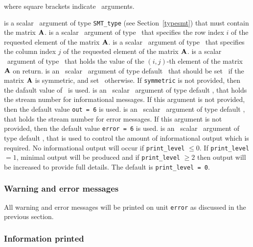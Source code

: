 \documentclass{galahad}
\begin{document}
\vspace*{1mm}
\noindent where square brackets indicate \optional\ arguments.
\vspace*{0mm}
\begin{description}
   is a scalar \intentin\ argument of type {\tt SMT\_type} (see
     Section~\ref{typesmt}) that must contain the matrix ${\mathbf{A}}$.
   is a scalar \intentin\ argument of type \integer\ that
     specifies the row index $i$ of the requested element of the
     matrix ${\mathbf{A}}$.
   is a scalar \intentin\ argument of type \integer\ that
     specifies the column index $j$ of the requested element of the
     matrix ${\mathbf{A}}$.
   is a scalar \intentout\ argument of type \realdp\ that
     holds the value of the $(i,j)$-th element of the matrix ${\mathbf{A}}$ on return.
   is an \optional\ scalar \intentin\ argument of type default
     \logical\ that should be set \true\ if the matrix ${\mathbf{A}}$ is
     symmetric, and set \false\ otherwise.  If {\tt symmetric} is not
     provided, then the dafault value of \false\ is used.
   is an \optional\ scalar \intentin\ argument of type default \integer, that holds the
     stream number for informational messages. If this argument is not
     provided, then the default value {\tt out = 6} is used.
   is an \optional\ scalar \intentin\ argument of type default \integer, that holds the
     stream number for error messages. If this argument is not
     provided, then the default value {\tt error = 6} is used.
   is an \optional\ scalar \intentin\ argument of type default \integer, that is used
     to control the amount of informational output which is required. No
     informational output will occur if {\tt print\_level} $\leq 0$. If
     {\tt print\_level} $= 1$, minimal output will be produced and if
     {\tt print\_level} $\geq 2$ then output will be
     increased to provide full details.
     The default is {\tt print\_level = 0}.
\end{description}

\subsubsection{Warning and error messages}\label{getval-error}

All warning and error messages will be printed on unit {\tt error} as
discussed in the previous section.

\subsubsection{Information printed}\label{getval-info}
\end{document}
